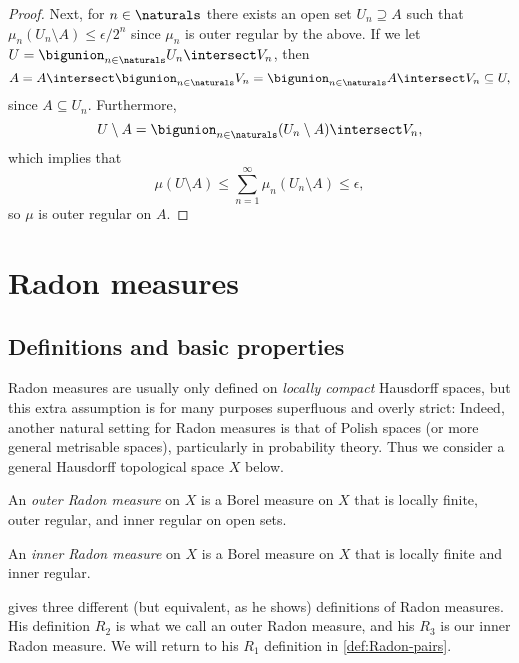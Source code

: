 \documentclass[article, a4paper, 11pt, oneside]{memoir}
\numberwithin{equation}{chapter}
\begin{document}
\begin{proof}
    Next, for $n \in \naturals$ there exists an open set $U_n \supseteq A$ such that $\mu_n(U_n \setminus A) \leq \epsilon/2^n$ since $\mu_n$ is outer regular by the above. If we let $U = \bigunion_{n\in\naturals} U_n \intersect V_n$, then
    \begin{equation*}
        A
            = A \intersect \bigunion_{n\in\naturals} V_n
            = \bigunion_{n\in\naturals} A \intersect V_n
            \subseteq U,
    \end{equation*}
    since $A \subseteq U_n$. Furthermore,
    \begin{equation*}
        U \setminus A
            = \bigunion_{n\in\naturals} (U_n \setminus A) \intersect V_n,
    \end{equation*}
    which implies that
    \begin{equation*}
        \mu(U \setminus A)
            \leq \sum_{n=1}^\infty \mu_n(U_n \setminus A)
            \leq \epsilon,
    \end{equation*}
    so $\mu$ is outer regular on $A$.
\end{proof}



\chapter{Radon measures}

\section{Definitions and basic properties}

Radon measures are usually only defined on \emph{locally compact} Hausdorff spaces, but this extra assumption is for many purposes superfluous and overly strict: Indeed, another natural setting for Radon measures is that of Polish spaces (or more general metrisable spaces), particularly in probability theory. Thus we consider a general Hausdorff topological space $X$ below.

\newcommand{\calM}{\mathcal{M}}
\newcommand{\radonout}{\calM^{+}}
\newcommand{\radonin}{\calM^{-}}

\begin{definition}
    \label{def:Radon-measures}
    An \emph{outer Radon measure} on $X$ is a Borel measure on $X$ that is locally finite, outer regular, and inner regular on open sets.

    An \emph{inner Radon measure} on $X$ is a Borel measure on $X$ that is locally finite and inner regular.
\end{definition}
%
\textcite{schwartz1973} gives three different (but equivalent, as he shows) definitions of Radon measures. His definition $R_2$ is what we call an outer Radon measure, and his $R_3$ is our inner Radon measure. We will return to his $R_1$ definition in \cref{def:Radon-pairs}.
\end{document}
